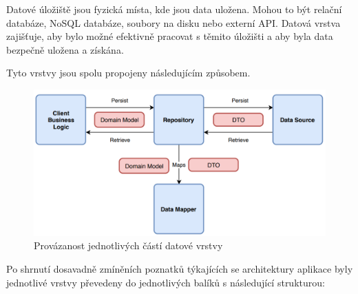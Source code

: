 Datové úložiště jsou fyzická místa, kde jsou data uložena. Mohou to být relační databáze, NoSQL databáze, soubory na disku nebo externí API. 
Datová vrstva zajišťuje, aby bylo možné efektivně pracovat s těmito úložišti a aby byla data bezpečně uložena a získána.

\bigskip

Tyto vrstvy jsou spolu propojeny následujícím způsobem.

\begin{figure}[H]
  \centering
  \includegraphics[width=.8\textwidth]{arch_diagram.png}
  \caption{Provázanost jednotlivých částí datové vrstvy}
  \label{fig:arch_diagram}
\end{figure}

\bigskip

Po shrnutí dosavadně zmíněních poznatků týkajících se architektury aplikace byly jednotlivé vrstvy převedeny do jednotlivých balíků s následující
strukturou:

\bigskip






